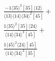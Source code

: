 \documentclass[varwidth, border=5pt]{standalone}
\begin{document}
\begin{my}
$\begin{gathered}
\scriptscriptstyle\frac{-1⟨35⟩^2[35]⟨12⟩}{⟨13⟩⟨14⟩⟨34⟩^2[45]}+\\
\scriptscriptstyle\frac{1⟨35⟩^2[35]⟨24⟩}{⟨14⟩⟨34⟩^3[45]}+\\
\scriptscriptstyle\frac{1⟨45⟩^2⟨24⟩[45]}{⟨14⟩⟨34⟩^3[35]}\phantom{+}
\end{gathered}$
\end{my}
\end{document}
